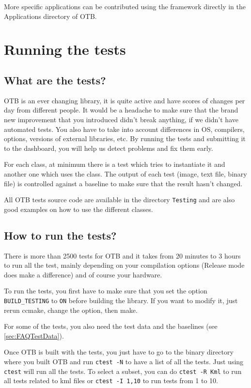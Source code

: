 More specific applications can be contributed using the framework
directly in the Applications directory of OTB.

\section{Running the tests}\label{sec:runningTheTests}

\subsection{What are the tests?}

OTB is an ever changing library, it is quite active and have scores of
changes per day from different people. It would be a headache to make
sure that the brand new improvement that you introduced didn't break
anything, if we didn't have automated tests. You also have to take into
account differences in OS, compilers, options, versions of external
libraries, etc. By running the tests and submitting it to the dashboard,
you will help us detect problems and fix them early.

For each class, at minimum there is a test which tries to instantiate it and another one which uses the class. The output of each test (image, text file, binary file) is controlled against a baseline to make sure that the result hasn't changed.

All OTB tests source code are available in the directory \texttt{Testing} and are also good examples on how to use the different classes.

\subsection{How to run the tests?}

There is more than 2500 tests for OTB and it takes from 20 minutes to 3 hours to run all the test, mainly depending on your compilation options (Release mode does make a difference) and of course your hardware.

To run the tests, you first have to make sure that you set the option \texttt{BUILD\_TESTING} to \texttt{ON} before building the library. If you want to modify it, just rerun ccmake, change the option, then make.

For some of the tests, you also need the test data and the baselines (see \ref{sec:FAQTestData}).

Once OTB is built with the tests, you just have to go to the binary directory where you built OTB and run \texttt{ctest -N} to have a list of all the tests. Just using \texttt{ctest} will run all the tests. To select a subset, you can do \texttt{ctest -R Kml} to run all tests related to kml files or \texttt{ctest -I 1,10} to run tests from 1 to 10.

